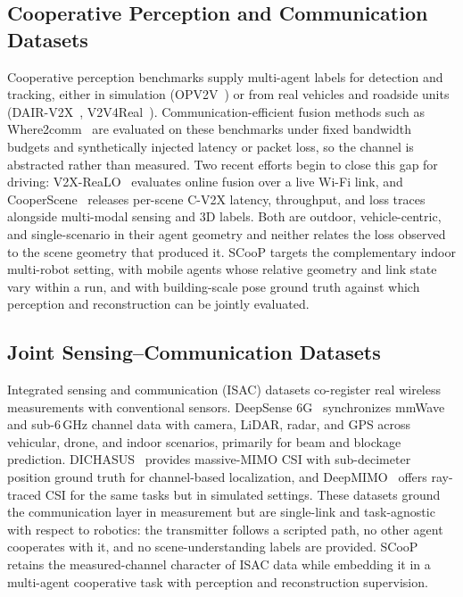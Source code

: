 \documentclass[conference]{IEEEtran}
\begin{document}
\subsection{Cooperative Perception and Communication Datasets}
Cooperative perception benchmarks supply multi-agent labels for
detection and tracking, either in simulation
(OPV2V~\cite{opv2v}) or from real vehicles and
roadside units (DAIR-V2X~\cite{dairv2x}, V2V4Real~\cite{v2v4real}). Communication-efficient fusion methods such
as Where2comm~\cite{where2comm} are evaluated on these benchmarks
under fixed bandwidth budgets and synthetically injected latency or
packet loss, so the channel is abstracted rather than measured.
Two recent efforts begin to close this gap for driving:
V2X-ReaLO~\cite{v2xrealo} evaluates online fusion over a live Wi-Fi
link, and CooperScene~\cite{cooperscene} releases per-scene C-V2X
latency, throughput, and loss traces alongside multi-modal sensing
and 3D labels. Both are outdoor, vehicle-centric, and
single-scenario in their agent geometry and neither relates the loss observed to the scene geometry that produced it. SCooP targets the
complementary indoor multi-robot setting, with mobile agents whose
relative geometry and link state vary within a run, and with
building-scale pose ground truth against which perception and
reconstruction can be jointly evaluated.

\subsection{Joint Sensing--Communication Datasets}
Integrated sensing and communication (ISAC) datasets co-register
real wireless measurements with conventional sensors. DeepSense
6G~\cite{deepsense6g} synchronizes mmWave and sub-6\,GHz channel data
with camera, LiDAR, radar, and GPS across vehicular, drone, and
indoor scenarios, primarily for beam and blockage prediction.
DICHASUS~\cite{dichasus} provides massive-MIMO CSI with
sub-decimeter position ground truth for channel-based localization,
and DeepMIMO~\cite{deepmimo} offers ray-traced CSI for the same
tasks but in simulated settings. These datasets ground the communication layer in measurement but are single-link and task-agnostic with respect to
robotics: the transmitter follows a scripted path, no other agent
cooperates with it, and no scene-understanding labels are provided.
SCooP retains the measured-channel character of ISAC data while
embedding it in a multi-agent cooperative task with perception and
reconstruction supervision.
\end{document}
